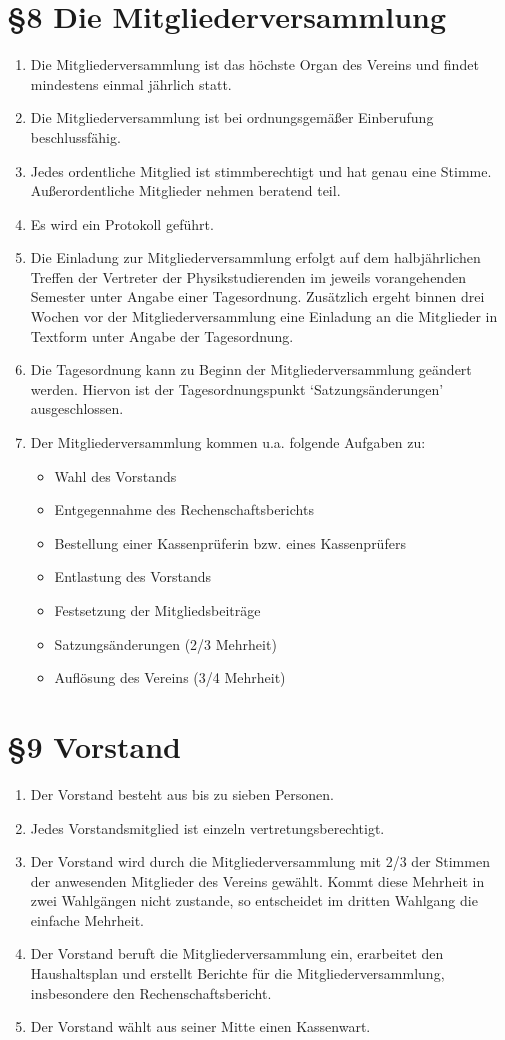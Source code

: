 \documentclass[ngerman]{article}
\begin{document}
\section*{§8 Die Mitgliederversammlung}
\begin{enumerate}
 \item Die Mitgliederversammlung ist das höchste Organ des Vereins und findet mindestens einmal jährlich statt.
 \item Die Mitgliederversammlung ist bei ordnungsgemäßer Einberufung beschlussfähig.
 \item Jedes ordentliche Mitglied ist stimmberechtigt und hat genau eine Stimme. Außerordentliche Mitglieder nehmen beratend teil.
 \item Es wird ein Protokoll geführt.
 \item Die Einladung zur Mitgliederversammlung erfolgt auf dem halbjährlichen Treffen der Vertreter der Physikstudierenden im jeweils vorangehenden Semester unter Angabe einer Tagesordnung. Zusätzlich ergeht binnen drei Wochen vor der Mitgliederversammlung eine Einladung an die Mitglieder in Textform unter Angabe der Tagesordnung.
 \item Die Tagesordnung kann zu Beginn der Mitgliederversammlung geändert werden. Hiervon ist der Tagesordnungspunkt `Satzungsänderungen' ausgeschlossen.
 \item Der Mitgliederversammlung kommen u.a. folgende Aufgaben zu:
 \begin{itemize}
  \item Wahl des Vorstands
  \item Entgegennahme des Rechenschaftsberichts
  \item Bestellung einer Kassenprüferin bzw. eines Kassenprüfers
  \item Entlastung des Vorstands
  \item Festsetzung der Mitgliedsbeiträge
  \item Satzungsänderungen (2/3 Mehrheit)
  \item Auflösung des Vereins (3/4 Mehrheit)
 \end{itemize}
\end{enumerate}


\section*{§9 Vorstand}
\begin{enumerate}
 \item Der Vorstand besteht aus bis zu sieben Personen.
 \item Jedes Vorstandsmitglied ist einzeln vertretungsberechtigt.
 \item Der Vorstand wird durch die Mitgliederversammlung mit 2/3 der Stimmen der anwesenden Mitglieder des Vereins gewählt. Kommt diese Mehrheit in zwei Wahlgängen nicht zustande, so entscheidet im dritten Wahlgang die einfache Mehrheit.
 \item Der Vorstand beruft die Mitgliederversammlung ein, erarbeitet den Haushaltsplan und erstellt Berichte für die Mitgliederversammlung, insbesondere den Rechenschaftsbericht.
 \item Der Vorstand wählt aus seiner Mitte einen Kassenwart.
\end{enumerate}
\end{document}
